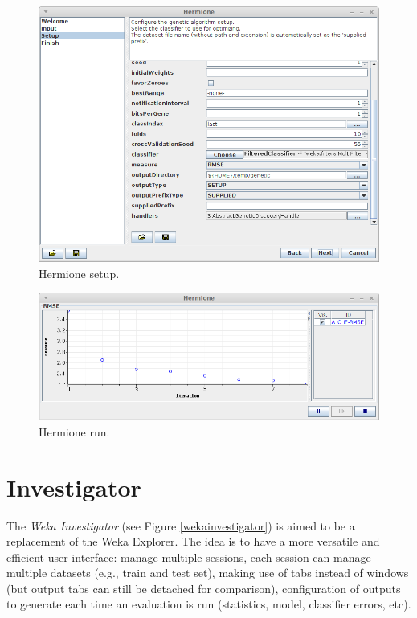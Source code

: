 \begin{figure}[htb]
  \centering
  \includegraphics[width=12.0cm]{images/hermione_setup.png}
  \caption{Hermione setup.}
  \label{hermione_setup}
\end{figure}

\begin{figure}[htb]
  \centering
  \includegraphics[width=12.0cm]{images/hermione_run.png}
  \caption{Hermione run.}
  \label{hermione_run}
\end{figure}

\clearpage
\section{Investigator}
The \textit{Weka Investigator} (see Figure \ref{wekainvestigator}) is aimed
to be a replacement of the Weka Explorer. The idea is to have a more versatile
and efficient user interface: manage multiple sessions, each session can manage
multiple datasets (e.g., train and test set), making use of tabs instead of windows
(but output tabs can still be detached for comparison), configuration of
outputs to generate each time an evaluation is run (statistics, model,
classifier errors, etc).

